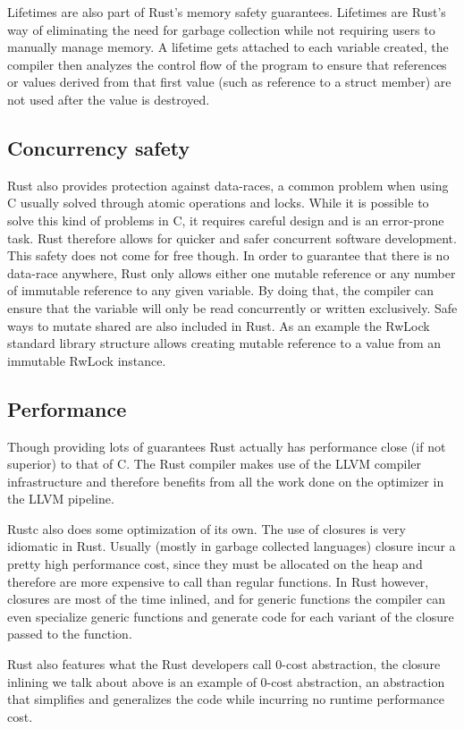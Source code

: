 \documentclass[11pt]{article}
\begin{document}
Lifetimes are also part of Rust's memory safety guarantees. Lifetimes
are Rust's way of eliminating the need for garbage collection while
not requiring users to manually manage memory. A lifetime gets
attached to each variable created, the compiler then analyzes the
control flow of the program to ensure that references or values
derived from that first value (such as reference to a struct member)
are not used after the value is destroyed.

\subsection{Concurrency safety}
Rust also provides protection against data-races, a common problem
when using C usually solved through atomic operations and locks.
While it is possible to solve this kind of problems in C, it requires
careful design and is an error-prone task. Rust therefore allows for
quicker and safer concurrent software development. This safety does not
come for free though. In order to guarantee that there is no data-race
anywhere, Rust only allows either one mutable reference or any number
of immutable reference to any given variable. By doing that, the
compiler can ensure that the variable will only be read concurrently
or written exclusively. Safe ways to mutate shared are also included
in Rust. As an example the RwLock standard library structure allows
creating mutable reference to a value from an immutable RwLock
instance.

\subsection{Performance}
Though providing lots of guarantees Rust actually has performance
close (if not superior) to that of C. The Rust compiler makes use of
the LLVM compiler infrastructure and therefore benefits from all the
work done on the optimizer in the LLVM pipeline.

Rustc also does some optimization of its own. The use of closures is very
idiomatic in Rust. Usually (mostly in garbage collected languages)
closure incur a pretty high performance cost, since they must be
allocated on the heap and therefore are more expensive to call than
regular functions. In Rust however, closures are most of the time
inlined, and for generic functions the compiler can even specialize
generic functions and generate code for each variant of the closure
passed to the function.

Rust also features what the Rust developers call 0-cost abstraction,
the closure inlining we talk about above is an example of 0-cost
abstraction, an abstraction that simplifies and generalizes the code
while incurring no runtime performance cost.
\end{document}
